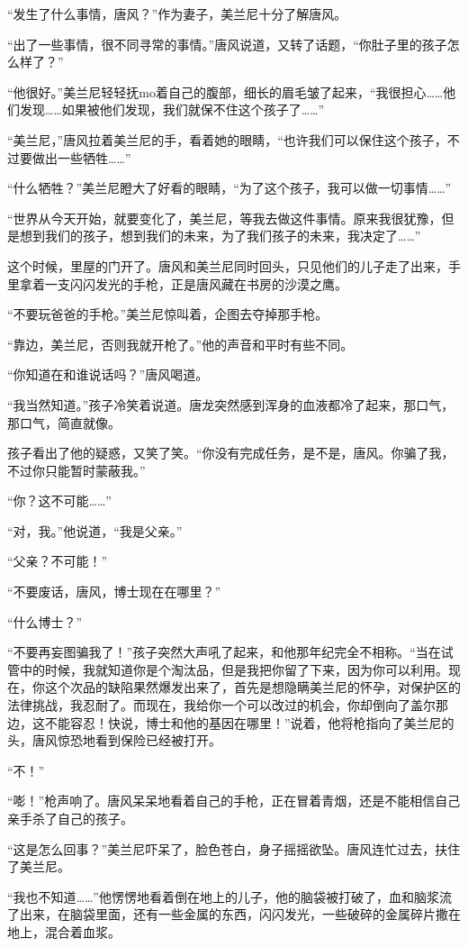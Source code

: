 “发生了什么事情，唐风？”作为妻子，美兰尼十分了解唐风。

“出了一些事情，很不同寻常的事情。”唐风说道，又转了话题，“你肚子里的孩子怎么样了？”

“他很好。”美兰尼轻轻抚mo着自己的腹部，细长的眉毛皱了起来，“我很担心……他们发现……如果被他们发现，我们就保不住这个孩子了……”

“美兰尼，”唐风拉着美兰尼的手，看着她的眼睛，“也许我们可以保住这个孩子，不过要做出一些牺牲……”

“什么牺牲？”美兰尼瞪大了好看的眼睛，“为了这个孩子，我可以做一切事情……”

“世界从今天开始，就要变化了，美兰尼，等我去做这件事情。原来我很犹豫，但是想到我们的孩子，想到我们的未来，为了我们孩子的未来，我决定了……”

这个时候，里屋的门开了。唐风和美兰尼同时回头，只见他们的儿子走了出来，手里拿着一支闪闪发光的手枪，正是唐风藏在书房的沙漠之鹰。

“不要玩爸爸的手枪。”美兰尼惊叫着，企图去夺掉那手枪。

“靠边，美兰尼，否则我就开枪了。”他的声音和平时有些不同。

“你知道在和谁说话吗？”唐风喝道。

“我当然知道。”孩子冷笑着说道。唐龙突然感到浑身的血液都冷了起来，那口气，那口气，简直就像。

孩子看出了他的疑惑，又笑了笑。“你没有完成任务，是不是，唐风。你骗了我，不过你只能暂时蒙蔽我。”

“你？这不可能……”

“对，我。”他说道，“我是父亲。”

“父亲？不可能！”

“不要废话，唐风，博士现在在哪里？”

“什么博士？”

“不要再妄图骗我了！”孩子突然大声吼了起来，和他那年纪完全不相称。“当在试管中的时候，我就知道你是个淘汰品，但是我把你留了下来，因为你可以利用。现在，你这个次品的缺陷果然爆发出来了，首先是想隐瞒美兰尼的怀孕，对保护区的法律挑战，我忍耐了。而现在，我给你一个可以改过的机会，你却倒向了盖尔那边，这不能容忍！快说，博士和他的基因在哪里！”说着，他将枪指向了美兰尼的头，唐风惊恐地看到保险已经被打开。

“不！”

“嘭！”枪声响了。唐风呆呆地看着自己的手枪，正在冒着青烟，还是不能相信自己亲手杀了自己的孩子。

“这是怎么回事？”美兰尼吓呆了，脸色苍白，身子摇摇欲坠。唐风连忙过去，扶住了美兰尼。

“我也不知道……”他愣愣地看着倒在地上的儿子，他的脑袋被打破了，血和脑浆流了出来，在脑袋里面，还有一些金属的东西，闪闪发光，一些破碎的金属碎片撒在地上，混合着血浆。

